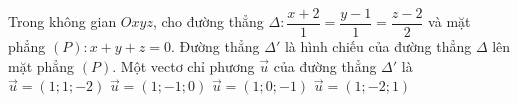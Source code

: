 \begin{ex}%
	Trong không gian $Oxyz$, cho đường thẳng $\Delta: \dfrac{x + 2}{1}=\dfrac{y - 1}{1}=\dfrac{z - 2}{2}$ và mặt phẳng $(P): x + y + z=0. $ Đường thẳng ${\Delta}'$ là hình chiếu của đường thẳng $\Delta $ lên mặt phẳng $(P). $ Một vectơ chỉ phương $\overrightarrow{u}$ của đường thẳng ${\Delta}'$ là
	\choice
	{\True $\overrightarrow{u}=\left(1; 1; - 2\right)$}
	{$\overrightarrow{u}=\left(1; - 1; 0\right)$}
	{$\overrightarrow{u}=\left(1; 0; - 1\right)$}
	{$\overrightarrow{u}=\left(1; - 2; 1\right)$}
	\end{ex}

